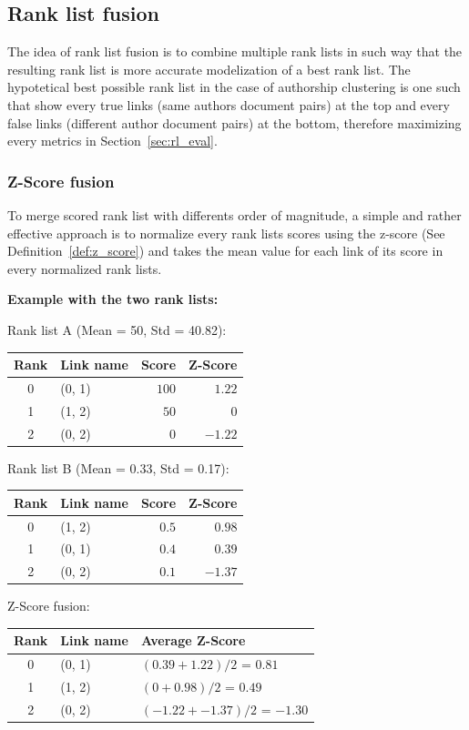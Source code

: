 \subsection{Rank list fusion}
\label{sec:rank_list_fusion}

The idea of rank list fusion is to combine multiple rank lists in such way that the resulting rank list is more accurate modelization of a best rank list.
The hypotetical best possible rank list in the case of authorship clustering is one such that show every true links (same authors document pairs) at the top and every false links (different author document pairs) at the bottom, therefore maximizing every metrics in Section~\ref{sec:rl_eval}.

\subsubsection{Z-Score fusion}

To merge scored rank list with differents order of magnitude, a simple and rather effective approach is to normalize every rank lists scores using the z-score (See Definition~\ref{def:z_score}) and takes the mean value for each link of its score in every normalized rank lists.

\textbf{Example with the two rank lists:}

Rank list A (Mean = 50, Std = 40.82):

\begin{tabular}{c l r r}
  \toprule
  Rank & Link name & Score & Z-Score \\
  \midrule
  0 & (0, 1) & $100$ & $1.22$ \\
  1 & (1, 2) & $50$ & $0$ \\
  2 & (0, 2) & $0$ & $-1.22$ \\
  \bottomrule
\end{tabular}

Rank list B (Mean = 0.33, Std = 0.17):

\begin{tabular}{c l r r}
  \toprule
  Rank & Link name & Score & Z-Score \\
  \midrule
  0 & (1, 2) & $0.5$ & $0.98$ \\
  1 & (0, 1) & $0.4$ & $0.39$ \\
  2 & (0, 2) & $0.1$ & $-1.37$ \\
  \bottomrule
\end{tabular}

Z-Score fusion:

\begin{tabular}{c l l}
  \toprule
  Rank & Link name & Average Z-Score \\
  \midrule
  0 & (0, 1) & $(0.39 + 1.22) / 2$ = $0.81$ \\
  1 & (1, 2) & $(0 + 0.98) / 2$ = $0.49$ \\
  2 & (0, 2) & $(-1.22 + -1.37) / 2$ = $-1.30$ \\
  \bottomrule
\end{tabular}

